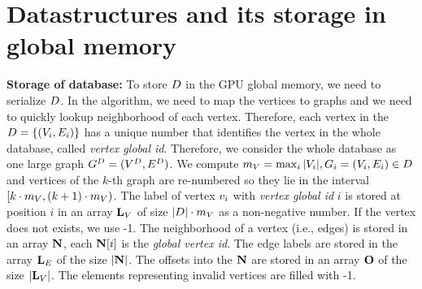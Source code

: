 \section{Datastructures and its storage in global memory}\label{sec:datastructures}



\noindent\textbf{Storage of database:} To store $D$ in the GPU
global memory, we need to serialize $D$. In the algorithm, we need
to map the vertices to graphs and we need to quickly lookup
neighborhood of each vertex.  Therefore, each vertex in the
$D=\{(V_i,E_i)\}$ has a unique number that identifies the vertex
in the whole database, called \emph{vertex global id}. Therefore, we
consider the whole database as one large graph $G^{D}=(V^D,
E^D)$. We compute $m_{V} = \max_i|V_i|, G_i=(V_i,E_i) \in D$
and vertices of the $k$-th graph are re-numbered so they lie in the
interval $[k\cdot m_{V}, (k+1)\cdot m_{V})$. The label of vertex
  $v_i$ with \emph{vertex global id} $i$ is stored at position $i$
  in an array $\mathbf{L}_V$ of size $|D|\cdot m_{V}$ as a
  non-negative number. If the vertex does not exists, we use -1. The
  neighborhood of a vertex (i.e., edges) is stored in an array
  $\mathbf{N}$, each $\mathbf{N}[i]$ is the \emph{global vertex
    id}. The edge labels are stored in the array $\mathbf{L}_E$ of the
  size $|\mathbf{N}|$. The offsets into the $\mathbf{N}$ are stored
  in an array $\mathbf{O}$ of the size $|\mathbf{L}_V|$. The
  elements representing invalid vertices are filled with -1.



